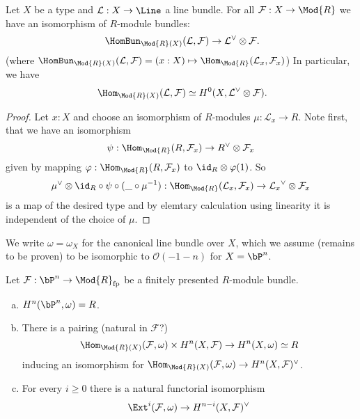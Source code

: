 
\begin{lemma}
  \label{bundle-homs-to-dual-tensor}
  Let $X$ be a type and $\mathcal L:X\to \Line$ a line bundle.
  For all $\mathcal F:X\to\Mod{R}$ we have an isomorphism of $R$-module bundles:
  \[ \HomBun_{\Mod{R}(X)}(\mathcal L,\mathcal F) \to \mathcal L^{\vee} \otimes \mathcal F\rlap{.}\]
  (where $\HomBun_{\Mod{R}(X)}(\mathcal L,\mathcal F)= (x:X) \mapsto \Hom_{\Mod{R}}(\mathcal L_x,\mathcal F_x)$)
  In particular, we have
  \[\Hom_{\Mod{R}(X)}(\mathcal L,\mathcal F) \simeq H^0(X,\mathcal L^{\vee} \otimes \mathcal F)\rlap{.} \]
\end{lemma}

\begin{proof}
  Let $x:X$ and choose an isomorphism of $R$-modules $\mu:\mathcal L_x\to R$.
  Note first, that we have an isomorphism
  \[ \psi: \Hom_{\Mod{R}}(R,\mathcal F_x) \to R^{\vee}\otimes \mathcal F_x\]
  given by mapping $\varphi:\Hom_{\Mod{R}}(R,\mathcal F_x)$ to $\id_R\otimes \varphi(1)$.
  So
  \[ \mu^{\vee}\otimes \id_R \circ \psi\circ (\_\circ \mu^{-1})
  : \Hom_{\Mod{R}}(\mathcal L_x,\mathcal F_x) \to {\mathcal L_x}^{\vee}\otimes \mathcal F_x\]
  is a map of the desired type and by elemtary calculation using linearity it is independent of the choice of $\mu$.
\end{proof}

We write $\omega=\omega_X$ for the canonical line bundle over $X$, which we assume (remains to be proven) to be isomorphic to $\mathcal O(-1-n)$ for $X=\bP^n$.

\begin{theorem}
  Let $\mathcal F:\bP^n\to\Mod{R}_{\mathrm{fp}}$ be a finitely presented $R$-module bundle.
  \begin{enumerate}[(a)]
  \item $H^n(\bP^n,\omega)=R$.
  \item There is a pairing (natural in $\mathcal F$?)
    \[ \Hom_{\Mod{R}(X)}(\mathcal F,\omega) \times H^n(X,\mathcal F) \to H^n(X,\omega) \simeq R \]
    inducing an isomorphism for $\Hom_{\Mod{R}(X)}(\mathcal F,\omega) \to H^n(X,\mathcal F)^\vee$.
  \item {} For every $i\geq 0$ there is a natural functorial isomorphism
    \[\Ext^i(\mathcal F,\omega) \to H^{n-i}(X,\mathcal F)^\vee \]
  \end{enumerate}
\end{theorem}


